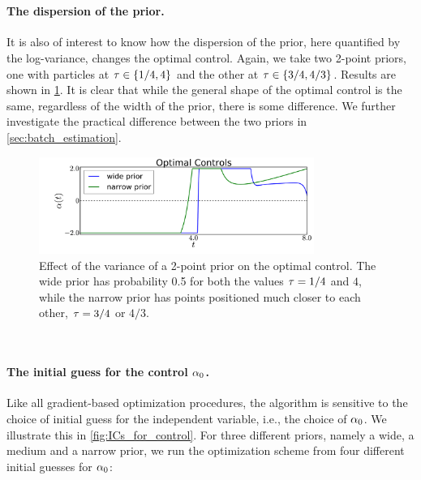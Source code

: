 \documentclass[12pt]{article}
\begin{document}
\

\paragraph{The dispersion of the prior.}
It is also of
interest to know how the dispersion of the prior, here quantified
by the log-variance, changes the optimal control. Again, we take two
2-point priors, one with 
particles at ${ \tau } \in \{1/4, 4\}$ and the other at ${ \tau } \in
\{3/4,4/3\}$. Results
are shown in \cref{fig:prior_dispersion_impact}. It is clear that while the
general shape of the optimal control is the same, regardless of the width of
the prior, there is some difference. We further investigate the
practical difference between the two priors in 
\cref{sec:batch_estimation}.
 
\begin{figure}[htp]
\begin{center}
  \includegraphics[width=0.8\textwidth]{Figs/AdjointOptimizer/PriorSpread.pdf}
  \caption[Effect of the variance of a prior on the Optimal Control]{Effect of
  the variance of a 2-point prior on the optimal control. The wide prior has probability 0.5 for both the values ${ \tau } =  1/4$
  and $4$, while the narrow prior has points positioned much
   closer to each other, ${ \tau } =   3/4$ or $4/3$.  }
  \label{fig:prior_dispersion_impact} 
\end{center}
\end{figure}

\

\paragraph{The initial guess for the control ${\alpha}_0$.}

Like all gradient-based optimization procedures, the algorithm is sensitive to the choice
of initial guess for the independent variable, i.e., the choice of
${\alpha}_0$. We illustrate this in \cref{fig:ICs_for_control}. For three
different priors, namely a wide, a medium and a narrow prior, we run the
optimization scheme from four different initial guesses for 
${\alpha}_0$:
\end{document}
